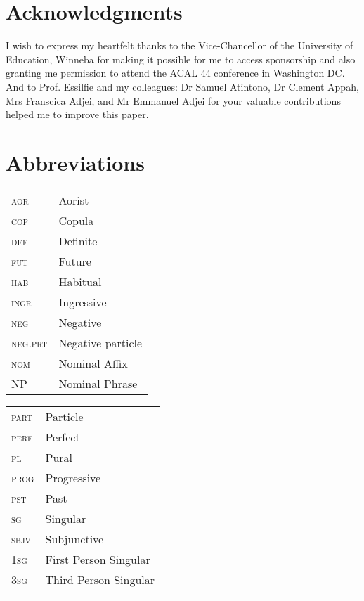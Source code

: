 \documentclass[output=paper,newtxmath,modfonts,nonflat,draftmode]{langsci/langscibook}
\begin{document}
\section*{Acknowledgments}
I wish to express my heartfelt thanks to the Vice-Chancellor of the University of Education, Winneba for making it possible for me to access sponsorship and also granting me permission to attend the ACAL 44 conference in Washington DC. And to Prof. Essilfie and my colleagues: Dr Samuel Atintono, Dr Clement Appah, Mrs Franscica Adjei, and Mr Emmanuel Adjei for your valuable contributions helped me to improve this paper.
 
\section*{Abbreviations}

\begin{tabularx}{.45\textwidth}{lQ}
\textsc{aor} & Aorist \\
\textsc{cop} & Copula\\
 \textsc{def}&  Definite\\
 \textsc{fut}&  Future\\
 \textsc{hab}&  Habitual\\
\textsc{ingr}&  Ingressive\\
\textsc{neg}&  Negative \\
\textsc{neg.prt} &  Negative particle\\
 \textsc{nom} & Nominal Affix\\
 NP &  Nominal Phrase\\
\end{tabularx}
\begin{tabularx}{.45\textwidth}{lQ}
 \textsc{part} & Particle\\
 \textsc{perf}&  Perfect\\
 \textsc{pl}&  Pural\\
 \textsc{prog}&  Progressive\\
 \textsc{pst} & Past\\
 \textsc{sg} & Singular\\
 \textsc{sbjv} & Subjunctive\\
 1\textsc{sg}&  First Person Singular\\
 3\textsc{sg}&  Third Person Singular\\
 \\
 
\end{tabularx}



\sloppy
\printbibliography[heading=subbibliography,notkeyword=this]
\end{document}
